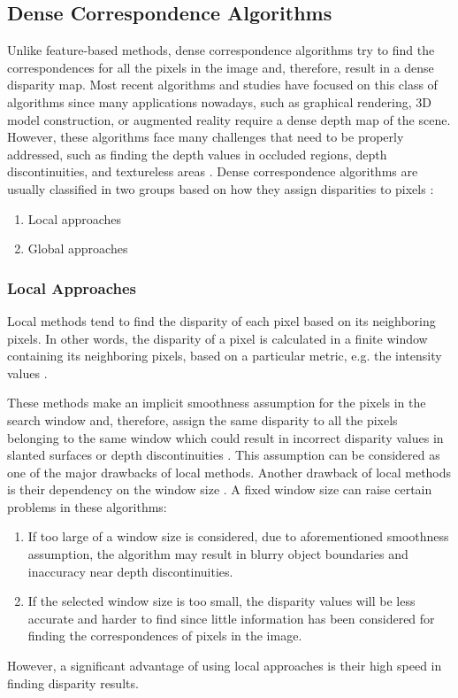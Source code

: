 \subsection{Dense Correspondence Algorithms}
Unlike feature-based methods, dense correspondence algorithms try to find the
correspondences for all the pixels in the image and, therefore, result in a dense disparity map. Most recent algorithms and studies have focused on this class of algorithms since many applications 
nowadays, such as graphical rendering, 3D model construction, or augmented reality require a dense depth map of the scene. 
However, these algorithms face many challenges that need to be properly
addressed, such as finding the depth values in occluded regions, depth discontinuities, and textureless areas \cite{sch02,bro03}. \newline
Dense correspondence algorithms are usually classified in two groups based on how they assign
disparities to pixels \cite{sze11}:
\begin{enumerate}
\item Local approaches
\item Global approaches
\end{enumerate}

\subsubsection{Local Approaches} 

Local methods tend to find the disparity of each pixel based on its neighboring pixels. In
other words, the disparity of a pixel is calculated in a finite window containing its neighboring pixels, based on a particular metric, e.g. the intensity values \cite{sch02}.

These methods make an implicit smoothness assumption for the pixels in the search
window and, therefore, assign the same disparity to all the pixels belonging to the same window which could result in incorrect disparity values in slanted surfaces or
depth discontinuities \cite{hirsch02}. This assumption can be considered as one of the major drawbacks of local methods.
Another drawback of local methods is their dependency on the window size \cite{sch02}. A fixed window size can raise certain problems in these algorithms:
\begin{enumerate}
\item If too large of a window size is considered, due to aforementioned smoothness assumption, the algorithm may result in blurry object boundaries and inaccuracy near depth discontinuities.
\item If the selected window size is too small, the disparity values will be less accurate and harder to find since little information has been considered for 
finding the correspondences of pixels in the image.
\end{enumerate}
However, a significant advantage of using local approaches is their high speed in finding disparity results.

